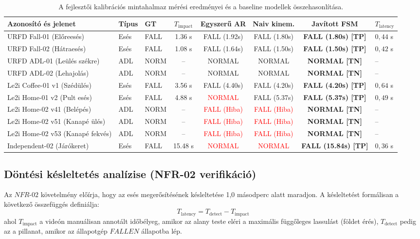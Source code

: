 \documentclass[12pt,a4paper,oneside]{report}
\begin{document}
\begin{table}[H]
\centering
\small
\begin{tabularx}{\textwidth}{llXcccc}
\toprule
\textbf{Azonosító és jelenet} & \textbf{Típus} & \textbf{GT} & \textbf{$T_{\text{impact}}$} & \textbf{Egyszerű AR} & \textbf{Naiv kinem.} & \textbf{Javított FSM} & \textbf{$T_{\text{latency}}$} \\
\midrule
URFD Fall-01 (Előreesés) & Esés & FALL & 1.36 s & FALL (1.92s) & FALL (1.80s) & \textbf{FALL (1.80s) [TP]} & $0{,}44$ s \\
URFD Fall-02 (Hátraesés) & Esés & FALL & 1.08 s & FALL (1.64s) & FALL (1.50s) & \textbf{FALL (1.50s) [TP]} & $0{,}42$ s \\
URFD ADL-01 (Leülés székre) & ADL & NORM & -- & NORMAL & NORMAL & \textbf{NORMAL [TN]} & -- \\
URFD ADL-02 (Lehajolás) & ADL & NORM & -- & NORMAL & NORMAL & \textbf{NORMAL [TN]} & -- \\
Le2i Coffee-01 v1 (Szédülés) & Esés & FALL & 3.56 s & FALL (4.40s) & FALL (4.20s) & \textbf{FALL (4.20s) [TP]} & $0{,}64$ s \\
Le2i Home-01 v2 (Pult esés) & Esés & FALL & 4.88 s & \textcolor{red}{NORMAL} & FALL (5.37s) & \textbf{FALL (5.37s) [TP]} & $0{,}49$ s \\
Le2i Home-02 v41 (Belépés) & ADL & NORM & -- & \textcolor{red}{FALL (Hiba)} & \textcolor{red}{FALL (Hiba)} & \textbf{NORMAL [TN]} & -- \\
Le2i Home-02 v51 (Kanapé ülés) & ADL & NORM & -- & \textcolor{red}{FALL (Hiba)} & \textcolor{red}{FALL (Hiba)} & \textbf{NORMAL [TN]} & -- \\
Le2i Home-02 v53 (Kanapé fekvés) & ADL & NORM & -- & \textcolor{red}{FALL (Hiba)} & \textcolor{red}{FALL (Hiba)} & \textbf{NORMAL [TN]} & -- \\
Independent-02 (Járókeret) & Esés & FALL & 15.48 s & \textcolor{red}{NORMAL} & \textcolor{red}{NORMAL} & \textbf{FALL (15.84s) [TP]} & $0{,}36$ s \\
\bottomrule
\end{tabularx}
\caption{A fejlesztői kalibrációs mintahalmaz mérési eredményei és a baseline modellek összehasonlítása.}
\label{tab:full_benchmark}
\end{table}

\subsection{Döntési késleltetés analízise (NFR-02 verifikáció)}
Az $NFR\text{-}02$ követelmény előírja, hogy az esés megerősítésének késleltetése 1,0 másodperc alatt maradjon. A késleltetést formálisan a következő összefüggés definiálja:
\begin{equation}
T_{\text{latency}} = T_{\text{detect}} - T_{\text{impact}}
\end{equation}
ahol $T_{\text{impact}}$ a videón manuálisan annotált időbélyeg, amikor az alany teste eléri a maximális függőleges lassulást (földet érés), $T_{\text{detect}}$ pedig az a pillanat, amikor az állapotgép $FALLEN$ állapotba lép.
\end{document}
